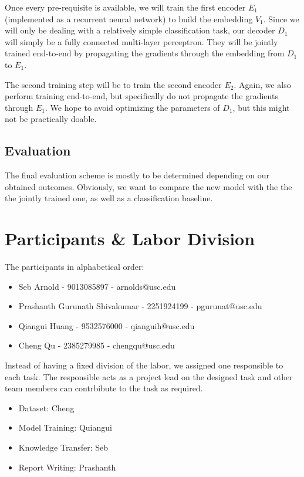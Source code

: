 \documentclass[12pt]{article}
\begin{document}
Once every pre-requisite is available, we will train the first encoder
$E_1$ (implemented as a recurrent neural network) to build the embedding
$V_1$. Since we will only be dealing with a relatively simple
classification task, our decoder $D_1$ will simply be a fully connected
multi-layer perceptron. They will be jointly trained end-to-end by
propagating the gradients through the embedding from $D_1$ to $E_1$.

The second training step will be to train the second encoder $E_2$.
Again, we also perform training end-to-end, but specifically do not
propagate the gradients through $E_1$. We hope to avoid optimizing the
parameters of $D_1$, but this might not be practically doable.

\subsection{Evaluation}\label{evaluation}

The final evaluation scheme is mostly to be determined depending on our
obtained outcomes. Obviously, we want to compare the new model with the
the the jointly trained one, as well as a classification baseline.

\section{Participants \& Labor
Division}\label{participants-labor-division}

The participants in alphabetical order:

\begin{itemize}
\itemsep1pt\parskip0pt
\item
  Seb Arnold - 9013085897 - arnolds@usc.edu
\item
  Prashanth Gurunath Shivakumar - 2251924199 - pgurunat@usc.edu
\item
  Qiangui Huang - 9532576000 - qianguih@usc.edu
\item
  Cheng Qu - 2385279985 - chengqu@usc.edu
\end{itemize}

Instead of having a fixed division of the labor, we assigned one
responsible to each task. The responsible acts as a project lead on the
designed task and other team members can contrbibute to the task as
required.

\begin{itemize}
\item
  Dataset: Cheng
\item
  Model Training: Quiangui
\item
  Knowledge Transfer: Seb
\item
  Report Writing: Prashanth
\end{itemize}
\end{document}
